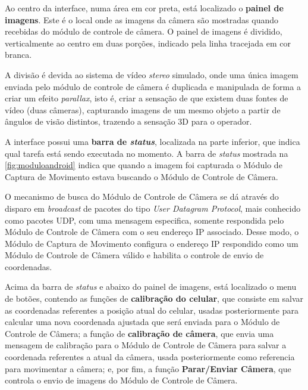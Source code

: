 Ao centro da interface, numa área em cor preta, está localizado o \textbf{painel de imagens}. Este é o local onde as imagens da câmera são mostradas quando recebidas do módulo de controle de câmera. O painel de imagens é dividido, verticalmente ao centro em duas porções, indicado pela linha tracejada em cor branca.\par

A divisão é devida ao sistema de vídeo \textit{stereo} simulado, onde uma única imagem enviada pelo módulo de controle de câmera é duplicada e manipulada de forma a criar um efeito \textit{parallax}, isto é, criar a sensação de que existem duas fontes de vídeo (duas câmeras), capturando imagens de um mesmo objeto a partir de ângulos de visão distintos, trazendo a sensação 3D para o operador.\par

A interface possui uma \textbf{barra de \textit{status}}, localizada na parte inferior, que indica qual tarefa está sendo executada no momento. A barra de \textit{status} mostrada na \autoref{fig:moduloandroid} indica que quando a imagem foi capturada o Módulo de Captura de Movimento estava buscando o Módulo de Controle de Câmera.\par

O mecanismo de busca do Módulo de Controle de Câmera se dá através do disparo em \textit{broadcast} de pacotes do tipo \textit{User Datagram Protocol}, mais conhecido como pacotes UDP, com uma mensagem especifica, somente respondida pelo Módulo de Controle de Câmera com o seu endereço IP associado. Desse modo, o Módulo de Captura de Movimento configura o endereço IP respondido como um Módulo de Controle de Câmera válido e habilita o controle de envio de coordenadas.\par

Acima da barra de \textit{status} e abaixo do painel de imagens, está localizado o menu de botões, contendo as funções de \textbf{calibração do celular}, que consiste em salvar as coordenadas referentes a posição atual do celular, usadas posteriormente para calcular uma nova coordenada ajustada que será enviada para o Módulo de Controle de Câmera; a função de \textbf{calibração de câmera}, que envia uma mensagem de calibração para o Módulo de Controle de Câmera para salvar a coordenada referentes a atual da câmera, usada posteriormente como referencia para movimentar a câmera; e, por fim, a função \textbf{Parar/Enviar Câmera}, que controla o envio de imagens do Módulo de Controle de Câmera.\par


